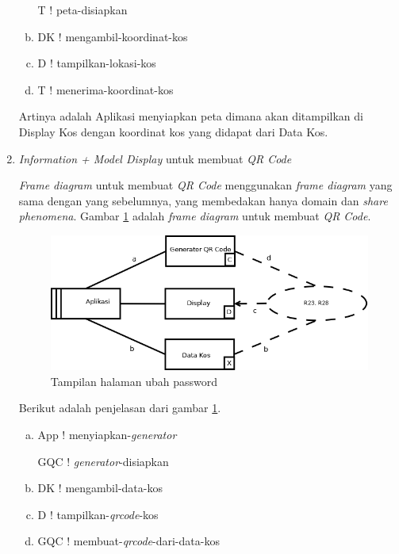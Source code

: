 \begin{enumerate}[-]
\begin{enumerate}[a.]
				T ! peta-disiapkan
				
				\item DK ! mengambil-koordinat-kos
				
				\item D ! tampilkan-lokasi-kos
				\item T ! menerima-koordinat-kos
			\end{enumerate}
		
		Artinya adalah Aplikasi menyiapkan peta dimana akan ditampilkan di Display Kos dengan koordinat kos yang didapat dari Data Kos.
		
			\item \textit{Information + Model Display} untuk membuat \textit{QR Code}
			
			\textit{Frame diagram} untuk membuat \textit{QR Code} menggunakan \textit{frame diagram} yang sama dengan yang sebelumnya, yang membedakan hanya domain dan \textit{share phenomena}. Gambar \ref{pb6} adalah \textit{frame diagram} untuk membuat \textit{QR Code}.
			
			\begin{figure}[H]
				\centering
				\includegraphics[scale=0.4]{gambar/6}
				\caption{Tampilan halaman ubah password}
				\label{pb6}
			\end{figure}
		
			Berikut adalah penjelasan dari gambar \ref{pb6}.
			
			\begin{enumerate}[a.]
				\item App ! menyiapkan-\textit{generator}
				
				GQC ! \textit{generator}-disiapkan
				
				\item DK ! mengambil-data-kos
				
				\item D ! tampilkan-\textit{qrcode}-kos
				\item GQC ! membuat-\textit{qrcode}-dari-data-kos
			\end{enumerate}
		

\end{enumerate}
